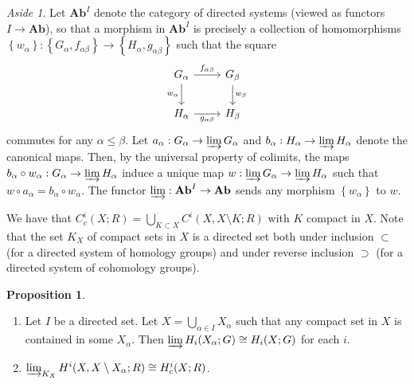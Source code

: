 \documentclass[10pt,letterpaper,cm]{nupset}
\theoremstyle{definition}
\theoremstyle{theorem}
\newtheorem{prop}[definition]{Proposition}
\theoremstyle{remark}
\newtheorem*{aside}{Aside}
\newcommand{\1}{\mathbb{1}}
\newcommand{\0}{\vec 0}
\begin{document}
\begin{aside}
Let $\mathbf{Ab}^I$ denote the category of directed systems (viewed as functors $I \to \mathbf{Ab}$), so that a morphism in $\mathbf{Ab}^I$ is precisely a collection of homomorphisms $\left\{w_{\alpha}\right\}: \left\{G_{\alpha}, f_{\alpha{\beta}}\right\} \to \left\{H_{\alpha}, g_{\alpha{\beta}}\right\}$ such that the square 
\[ \begin{tikzcd}
G_{\alpha} \arrow[d, "w_{\alpha}"'] \arrow[r, "f_{\alpha{\beta}}"] & G_{\beta} \arrow[d, "w_{\beta}"] \\
H_{\alpha} \arrow[r, "g_{\alpha{\beta}}"']                         & H_{\beta}                       
\end{tikzcd}
\] commutes for any $\alpha \leq \beta$. Let $a_{\alpha} : G_{\alpha} \to \varinjlim G_{\alpha}$ and $b_{\alpha} : H_{\alpha} \to \varinjlim H_{\alpha}$ denote the canonical maps. Then, by the universal property of colimits, the maps $b_{\alpha} \circ w_{\alpha} : G_{\alpha} \to  \varinjlim H_{\alpha}$ induce a unique map $w:  \varinjlim G_{\alpha} \to  \varinjlim H_{\alpha}$ such that $w \circ a_{\alpha} = b_{\alpha} \circ w_{\alpha}$.
The functor $\varinjlim : \mathbf{Ab}^I \to \mathbf{Ab}$ sends any morphism $\left\{w_{\alpha}\right\}$ to $w$.
\end{aside}

\smallskip

We have that $C_c^i(X; R) = \bigcup_{K \subset X} C^i(X, X \setminus K; R)$ with  $K$ compact in $X$. Note that the set $K_X$ of compact sets in $X$ is a directed set both under inclusion $\subset$ (for a directed system of homology groups) and under reverse inclusion $\supset$ (for a directed system of cohomology groups). 


\begin{prop}\label{prop25} $ $
\begin{enumerate} [label=(\arabic*)]
\item Let $I$ be a directed set. Let $X= \bigcup_{\alpha \in I}X_{\alpha}$ such that any compact set in $X$ is contained in some $X_{\alpha}$. Then $\varinjlim H_i(X_{\alpha}; G) \cong H_i(X; G)$ for each $i$.
\item $\varinjlim_{K_X} H^i(X, X \setminus X_{\alpha}; R) \cong H^i_c(X; R)$.
\end{enumerate}
\end{prop}

\smallskip
\end{document}
